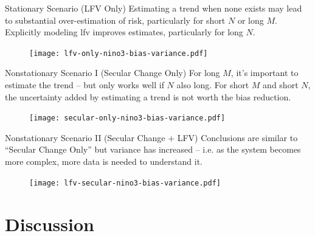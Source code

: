 \documentclass[
  10pt,     %
  handout   %
]{beamer}
\makeatletter
\newcommand*{\ie}{i.e.\@\xspace}
\makeatother
\begin{document}
\begin{frame}{Stationary Scenario (LFV Only)}
  Estimating a trend when none exists may lead to substantial over-estimation of risk, particularly for short $N$ or long $M$.
  Explicitly modeling \gls{lfv} improves estimates, particularly for long $N$.
  \begin{figure}
    \centering
    \texttt{[image: lfv-only-nino3-bias-variance.pdf]}
  \end{figure}
\end{frame}

\begin{frame}{Nonstationary Scenario I (Secular Change Only)}
  For long $M$, it's important to estimate the trend -- but only works well if $N$ also long.
  For short $M$ and short $N$, the uncertainty added by estimating a trend is not worth the bias reduction.
  \begin{figure}
    \centering
    \texttt{[image: secular-only-nino3-bias-variance.pdf]}
  \end{figure}
\end{frame}

\begin{frame}{Nonstationary Scenario II (Secular Change + LFV)}
  Conclusions are similar to ``Secular Change Only'' but variance has increased -- \ie as the system becomes more complex, more data is needed to understand it.
  \begin{figure}
    \centering
    \texttt{[image: lfv-secular-nino3-bias-variance.pdf]}
  \end{figure}
\end{frame}

\section{Discussion}
\end{document}
